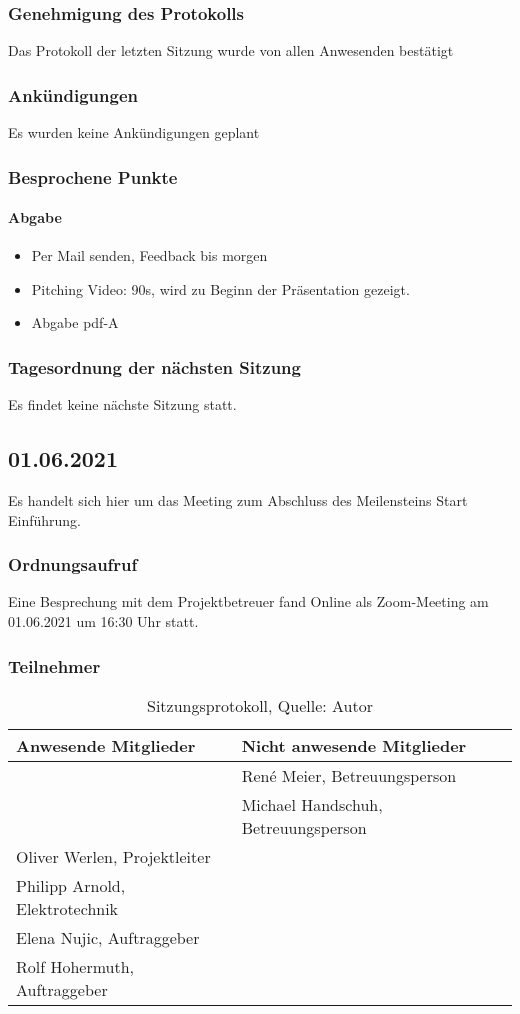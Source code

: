 \subsubsection{Genehmigung des Protokolls}
Das Protokoll der letzten Sitzung wurde von allen Anwesenden bestätigt
\subsubsection{Ankündigungen}
Es wurden keine Ankündigungen geplant
\subsubsection{Besprochene Punkte}
\paragraph{Abgabe}
\begin{itemize}
	\item Per Mail senden, Feedback bis morgen
	\item Pitching Video: 90s, wird zu Beginn der Präsentation gezeigt. 
	\item Abgabe pdf-A
\end{itemize}
\subsubsection{Tagesordnung der nächsten Sitzung}
Es findet keine nächste Sitzung statt. 
\newpage

\subsection{01.06.2021}
Es handelt sich hier um das Meeting zum Abschluss des Meilensteins Start Einführung. 
\subsubsection{Ordnungsaufruf}
Eine Besprechung mit dem Projektbetreuer fand Online als Zoom-Meeting am 01.06.2021 um 16:30 Uhr statt.
\subsubsection{Teilnehmer}
\begin{table}[H]
	\setlength\extrarowheight{2pt} %
	\begin{tabularx}{\textwidth}{|X|X|}
		\hline
		\textbf{Anwesende Mitglieder} &  \textbf{Nicht anwesende Mitglieder} \\
		\hline
		& René Meier, Betreuungsperson  \\
		&Michael Handschuh, Betreuungsperson   \\
		Oliver Werlen, Projektleiter &  \\
		Philipp Arnold, Elektrotechnik & \\
		Elena Nujic, Auftraggeber & \\
		Rolf Hohermuth, Auftraggeber  &\\
		\hline
	\end{tabularx}
	\caption{ \label{tbl: Teilnehmerliste vom 01.06.2021}Sitzungsprotokoll, Quelle: Autor}
\end{table}
